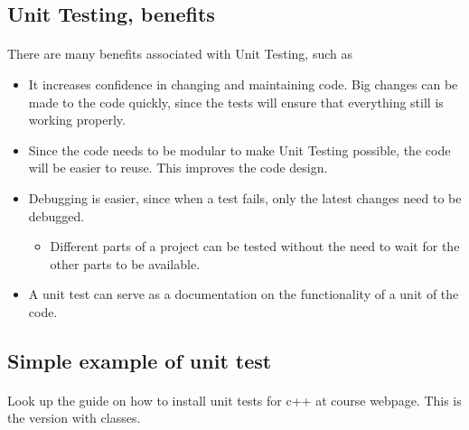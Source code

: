 \subsection*{Unit Testing, benefits}

\paragraph{}
There are many benefits associated with Unit Testing, such as
\begin{itemize}
  \item It increases confidence in changing and maintaining code. Big changes can be made to the code quickly, since the tests will ensure that everything still is working properly.

  \item Since the code needs to be modular to make Unit Testing possible, the code will be easier to reuse. This improves the code design.

  \item Debugging is easier, since when a test fails, only the latest changes need to be debugged.
\begin{itemize}

   \item Different parts of a project can be tested without the need to wait for the other parts to be available.

\end{itemize}

\noindent
  \item A unit test can serve as a documentation on the functionality of a unit of the code.
\end{itemize}

\noindent



\subsection*{Simple example of unit test}

\paragraph{}
Look up the guide on how to install unit tests for c++ at course webpage. This is the version with classes.



















